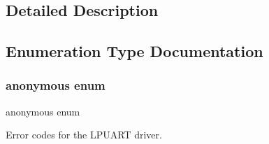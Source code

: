 \subsection{Detailed Description}


\subsection{Enumeration Type Documentation}
\mbox{\label{group__lpuart__driver_ga157d5577a5b2f5986037d0d09c7dc77d}} 
\subsubsection{\texorpdfstring{anonymous enum}{anonymous enum}}
{\footnotesize\ttfamily anonymous enum}



Error codes for the L\+P\+U\+A\+RT driver. 


